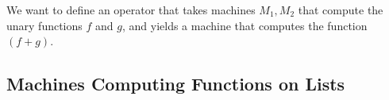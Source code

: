 We want to define an operator that takes machines $M_1, M_2$ that compute the unary functions $f$ and $g$, and yields a machine that computes the
function $(f+g)$.


\subsection{Machines Computing Functions on Lists}
\label{sec:ListTM}




